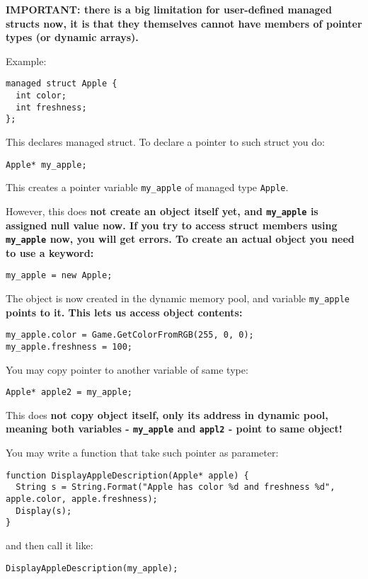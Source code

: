 \bf{IMPORTANT:} there is a big limitation for user-defined managed structs now, it is that they
themselves cannot have members of pointer types (or dynamic arrays).

Example:

\begin{verbatim}
managed struct Apple {
  int color;
  int freshness;
};
\end{verbatim}
This declares managed struct. To declare a pointer to such struct you do:

\begin{verbatim}
Apple* my_apple;
\end{verbatim}
This creates a pointer variable \verb$my_apple$ of managed type \verb$Apple$.

However, this does \bf{not} create an object itself yet, and \verb$my_apple$ is assigned
\bf{null} value now. If you try to access struct members using \verb$my_apple$ now, you will
get errors.
To create an actual object you need to use a  keyword:

\begin{verbatim}
my_apple = new Apple;
\end{verbatim}

The object is now created in the dynamic memory pool, and variable \verb$my_apple$
\bf{points} to it. This lets us access object contents:

\begin{verbatim}
my_apple.color = Game.GetColorFromRGB(255, 0, 0);
my_apple.freshness = 100;
\end{verbatim}

You may copy pointer to another variable of same type:
\begin{verbatim}
Apple* apple2 = my_apple;
\end{verbatim}

This does \bf{not} copy object itself, only its address in dynamic pool, meaning both
variables - \verb$my_apple$ and \verb$appl2$ - point to same object!

You may write a function that take such pointer as parameter:

\begin{verbatim}
function DisplayAppleDescription(Apple* apple) {
  String s = String.Format("Apple has color %d and freshness %d", apple.color, apple.freshness);
  Display(s);
}
\end{verbatim}

and then call it like:
\begin{verbatim}
DisplayAppleDescription(my_apple);
\end{verbatim}

